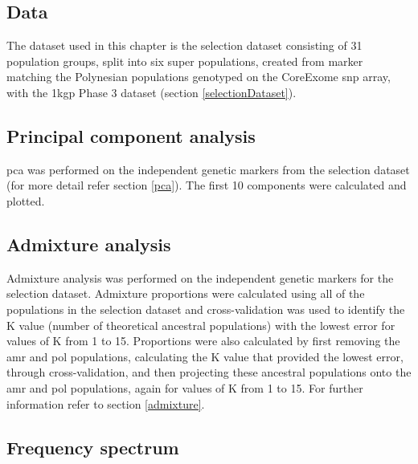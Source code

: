 \documentclass[]{report}
\begin{document}
\subsection{Data}\label{data}

The dataset used in this chapter is the selection dataset consisting of
31 population groups, split into six super populations, created from
marker matching the Polynesian populations genotyped on the CoreExome
\gls{snp} array, with the \gls{1kgp} Phase 3 dataset (section
\ref{selectionDataset}).

\subsection{Principal component
analysis}\label{principal-component-analysis}

\Glsdesc{pca} was performed on the independent genetic markers from the
selection dataset (for more detail refer section \ref{pca}). The first
10 components were calculated and plotted.

\subsection{Admixture analysis}\label{admixture-analysis}

Admixture analysis was performed on the independent genetic markers for
the selection dataset. Admixture proportions were calculated using all
of the populations in the selection dataset and cross-validation was
used to identify the K value (number of theoretical ancestral
populations) with the lowest error for values of K from 1 to 15.
Proportions were also calculated by first removing the \gls{amr} and
\gls{pol} populations, calculating the K value that provided the lowest
error, through cross-validation, and then projecting these ancestral
populations onto the \gls{amr} and \gls{pol} populations, again for
values of K from 1 to 15. For further information refer to section
\ref{admixture}.

\subsection{Frequency spectrum}\label{frequency-spectrum}
\end{document}
